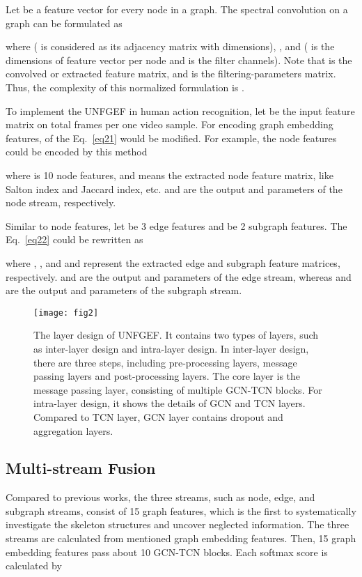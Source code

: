 \documentclass[journal]{IEEEtran}
\begin{document}
Let  be a feature vector for every node in a graph. The spectral convolution on a graph can be formulated as

where  ( is considered as its adjacency matrix with  dimensions), ,  and  ( is the dimensions of feature vector per node and  is the filter channels). Note that  is the convolved or extracted feature matrix, and  is the filtering-parameters matrix.  Thus, the complexity of this normalized formulation is .

To implement the UNFGEF in human action recognition, let  be the input feature matrix on total frames per one video sample. For encoding graph embedding features,  of the Eq.~\ref{eq21} would be modified. For example, the node features could be encoded by this method

where  is 10 node features, and  means the extracted node feature matrix, like Salton index and Jaccard index, etc.  and  are the output and parameters of the node stream, respectively.

Similar to node features, let  be 3 edge features and  be 2 subgraph features. The Eq.~\ref{eq22} could be rewritten as


where , , and  and  represent the extracted edge and subgraph feature matrices, respectively.  and  are the output and parameters of the edge stream, whereas  and  are the output and parameters of the subgraph stream.

\begin{figure*}
\centering
\texttt{[image: fig2]}
\caption{The layer design of UNFGEF. It contains two types of layers, such as inter-layer design and intra-layer design. In inter-layer design, there are three steps, including pre-processing layers, message passing layers and post-processing layers. The core layer is the message passing layer, consisting of multiple GCN-TCN blocks. For intra-layer design, it shows the details of GCN and TCN layers. Compared to TCN layer, GCN layer contains dropout and aggregation layers. }
\label{fig2}
\end{figure*}

\subsection{Multi-stream Fusion}

Compared to previous works, the three streams, such as node, edge, and subgraph streams, consist of 15 graph features, which is the first to systematically investigate the skeleton structures and uncover neglected information. The three streams are calculated from mentioned graph embedding features. Then, 15 graph embedding features pass about 10 GCN-TCN blocks. Each softmax score is calculated by
\end{document}
